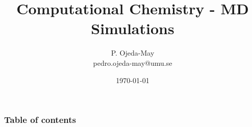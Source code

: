 \documentclass{beamer}
\begin{document}

\title{Computational Chemistry - MD Simulations} \author{P. Ojeda-May \\{\small pedro.ojeda-may@umu.se}} 

\date{\today}


\begin{frame}
\titlepage
\end{frame}

\begin{frame}\frametitle{Table of contents}\tableofcontents \end{frame}

%
%

%
%
%
%
%
%
\end{document}
